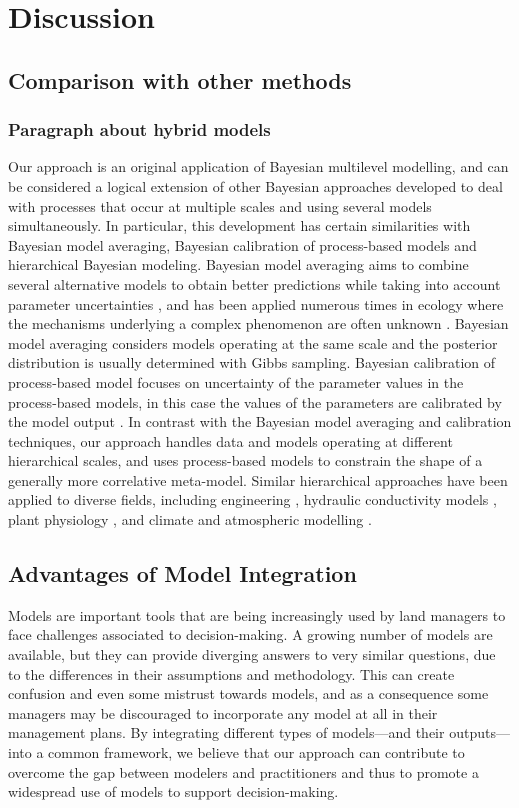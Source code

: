 \section*{Discussion}

\subsection*{Comparison with other methods}
\subsubsection*{Paragraph about hybrid models}

Our approach is an original application of Bayesian multilevel modelling, and can be considered a logical extension of other Bayesian approaches developed to deal with processes that occur at multiple scales and using several models simultaneously. 
In particular, this development has certain similarities with Bayesian model averaging, Bayesian calibration of process-based models and hierarchical Bayesian modeling. 
Bayesian model averaging aims to combine several alternative models to obtain better predictions while taking into account parameter uncertainties \citep{Hoeting1999}, and has been applied numerous times in ecology where the mechanisms underlying a complex phenomenon are often unknown \citep[e.g.][]{Wintle2003, Link2006}. 
Bayesian model averaging considers models operating at the same scale and the posterior distribution is usually determined with Gibbs sampling. 
Bayesian calibration of process-based model focuses on uncertainty of the parameter values in the process-based models, in this case the values of the parameters are calibrated by the model output \citep{VanOijen2005, VanOijen2011}. 
In contrast with the Bayesian model averaging and calibration techniques, our approach handles data and models operating at different hierarchical scales, and uses process-based models to constrain the shape of a generally more correlative meta-model.
Similar hierarchical approaches have been applied to diverse fields, including engineering \citep{Booth2013}, hydraulic conductivity models \citep{Dostert2009, Efendiev2005, Efendiev2005a}, plant physiology \citep{Ogle2008, Ogle2009}, and climate and atmospheric modelling \citep{Zimmerman2005, Mcmillan2010, Kang2012}.

\subsection*{Advantages of Model Integration}
Models are important tools that are being increasingly used by land managers to face challenges associated to decision-making. 
A growing number of models are available, but they can provide diverging answers to very similar questions, due to the differences in their assumptions and methodology. 
This can create confusion and even some mistrust towards models, and as a consequence some managers may be discouraged to incorporate any model at all in their management plans. 
By integrating different types of models---and their outputs---into a common framework, we believe that our approach can contribute to overcome the gap between modelers and practitioners and thus to promote a widespread use of models to support decision-making.

